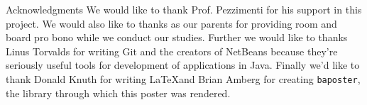 \documentclass[landscape,a0paper,fontscale=.46]{baposter} %
\begin{document}
\begin{poster}

\begin{posterbox}[name=conclusion, column=4, below=padding]{Acknowledgments} 
We would like to thank Prof. Pezzimenti for his support in this project. We would also like to thanks as our parents for providing room and board pro bono while we conduct our studies. Further we would like to thanks Linus Torvalds for writing Git and the creators of NetBeans because they're seriously useful tools for development of applications in Java. Finally we'd like to thank Donald Knuth for writing \LaTeX and Brian Amberg for creating \verb|baposter|, the library through which this poster was rendered.
\end{posterbox}

\end{poster}
\end{document}
